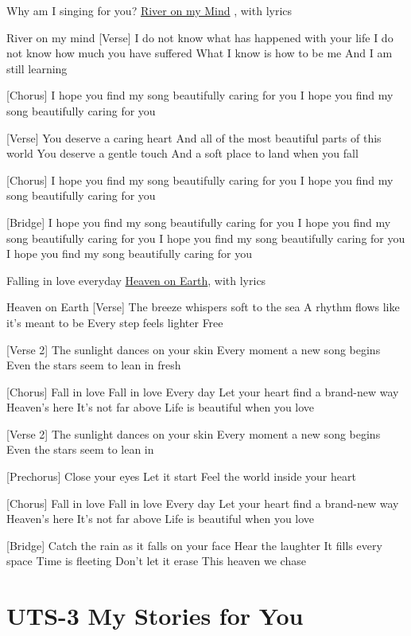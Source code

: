 \documentclass[
  letterpaper,
  DIV=11,
  numbers=noendperiod]{scrreprt}
\begin{document}
Why am I singing for you? \href{./Rivers\%20In\%20My\%20Mind.mp3}{River
on my Mind} , with lyrics

River on my mind {[}Verse{]} I do not know what has happened with your
life I do not know how much you have suffered What I know is how to be
me And I am still learning

{[}Chorus{]} I hope you find my song beautifully caring for you I hope
you find my song beautifully caring for you

{[}Verse{]} You deserve a caring heart And all of the most beautiful
parts of this world You deserve a gentle touch And a soft place to land
when you fall

{[}Chorus{]} I hope you find my song beautifully caring for you I hope
you find my song beautifully caring for you

{[}Bridge{]} I hope you find my song beautifully caring for you I hope
you find my song beautifully caring for you I hope you find my song
beautifully caring for you I hope you find my song beautifully caring
for you

Falling in love everyday \href{./Heaven\%20on\%20Earth.mp3}{Heaven on
Earth}, with lyrics

Heaven on Earth {[}Verse{]} The breeze whispers soft to the sea A rhythm
flows like it's meant to be Every step feels lighter Free

{[}Verse 2{]} The sunlight dances on your skin Every moment a new song
begins Even the stars seem to lean in fresh

{[}Chorus{]} Fall in love Fall in love Every day Let your heart find a
brand-new way Heaven's here It's not far above Life is beautiful when
you love

{[}Verse 2{]} The sunlight dances on your skin Every moment a new song
begins Even the stars seem to lean in

{[}Prechorus{]} Close your eyes Let it start Feel the world inside your
heart

{[}Chorus{]} Fall in love Fall in love Every day Let your heart find a
brand-new way Heaven's here It's not far above Life is beautiful when
you love

{[}Bridge{]} Catch the rain as it falls on your face Hear the laughter
It fills every space Time is fleeting Don't let it erase This heaven we
chase


\chapter{UTS-3 My Stories for You}\label{uts-3-my-stories-for-you}
\end{document}
